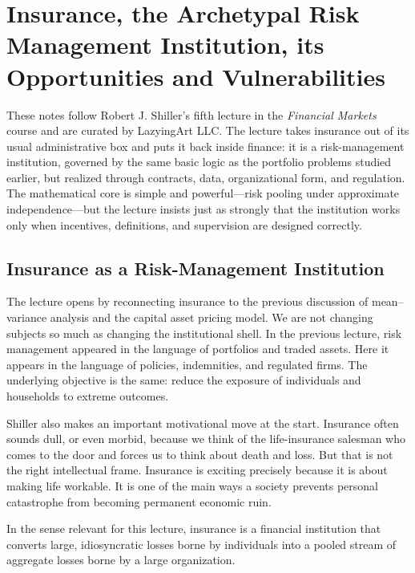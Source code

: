 \chapter{Insurance, the Archetypal Risk Management Institution, its Opportunities and Vulnerabilities}

These notes follow Robert J. Shiller's fifth lecture in the \emph{Financial Markets} course and are curated by LazyingArt LLC. The lecture takes insurance out of its usual administrative box and puts it back inside finance: it is a risk-management institution, governed by the same basic logic as the portfolio problems studied earlier, but realized through contracts, data, organizational form, and regulation. The mathematical core is simple and powerful---risk pooling under approximate independence---but the lecture insists just as strongly that the institution works only when incentives, definitions, and supervision are designed correctly.

\section{Insurance as a Risk-Management Institution}

The lecture opens by reconnecting insurance to the previous discussion of mean--variance analysis and the capital asset pricing model. We are not changing subjects so much as changing the institutional shell. In the previous lecture, risk management appeared in the language of portfolios and traded assets. Here it appears in the language of policies, indemnities, and regulated firms. The underlying objective is the same: reduce the exposure of individuals and households to extreme outcomes.

Shiller also makes an important motivational move at the start. Insurance often sounds dull, or even morbid, because we think of the life-insurance salesman who comes to the door and forces us to think about death and loss. But that is not the right intellectual frame. Insurance is exciting precisely because it is about making life workable. It is one of the main ways a society prevents personal catastrophe from becoming permanent economic ruin.

\begin{definition}
In the sense relevant for this lecture, insurance is a financial institution that converts large, idiosyncratic losses borne by individuals into a pooled stream of aggregate losses borne by a large organization.
\end{definition}

